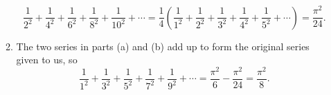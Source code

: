 \begin{enumerate}
\begin{enumerate}
\begin{equation*}
\frac{1}{2^2} + \frac{1}{4^2} + \frac{1}{6^2} + \frac{1}{8^2} + \frac{1}{10^2} + \cdots = \frac{1}{4}\left(\frac{1}{1^2} + \frac{1}{2^2} + \frac{1}{3^2} + \frac{1}{4^2} + \frac{1}{5^2} + \cdots\right) = \boxed{\frac{\pi^2}{24}}.
\end{equation*}
\item The two series in parts (a) and (b) add up to form the original series given to us, so
\begin{equation*}
\frac{1}{1^2} + \frac{1}{3^2} + \frac{1}{5^2} + \frac{1}{7^2} + \frac{1}{9^2} + \cdots = \frac{\pi^2}{6} - \frac{\pi^2}{24} = \boxed{\frac{\pi^2}{8}}.
\end{equation*}
\end{enumerate}
\end{enumerate}